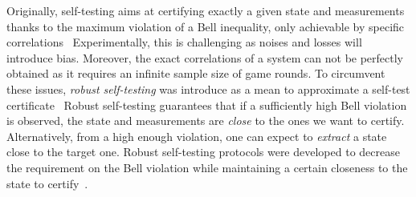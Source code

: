 \medbreak

Originally, self-testing aims at certifying exactly a given state and measurements thanks to the maximum violation of a Bell inequality, only achievable by specific correlations~\cite{Mayers2004}
Experimentally, this is challenging as noises and losses will introduce bias.
Moreover, the exact correlations of a system can not be perfectly obtained as it requires an infinite sample size of game rounds.
To circumvent these issues, \textit{robust self-testing} was introduce as a mean to approximate a self-test certificate~\cite{Kaniewski2016}
Robust self-testing guarantees that if a sufficiently high Bell violation is observed, the state and measurements are \textit{close} to the ones we want to certify.
Alternatively, from a high enough violation, one can expect to \textit{extract} a state close to the target one.
Robust self-testing protocols were developed to decrease the requirement on the Bell violation while maintaining a certain closeness to the state to certify~\cite{Bancal2015,Kaniewski2016,Kaniewski2017,Valcarce2022}.
